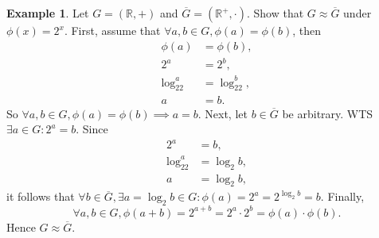 \documentclass{article}
\theoremstyle{definition}
\newtheorem{example}{Example}[section]
\begin{document}
 \begin{example}
    Let $G = (\mathbb{R},+)$ and $\overline{G} = (\mathbb{R}^+,\cdot)$. Show that $G \approx \overline{G}$ under $\phi(x)=2^x$.
    First, assume that $\forall a,b \in G, \phi(a) = \phi(b)$, then
    \begin{align*}
        \phi(a) &= \phi(b), \\
        2^a &= 2^b, \\
        \log_22^a &= \log_22^b, \\
        a &= b.
    \end{align*}
    So $\forall a,b \in G, \phi(a) = \phi(b) \implies a=b$. Next, let $b \in \overline{G}$ be arbitrary. WTS $\exists a \in G: 2^a = b$. Since
    \begin{align*}
        2^a &= b, \\
        \log_22^a &= \log_2b, \\
        a &= \log_2b,
    \end{align*}
    it follows that $\forall b \in \overline{G}, \exists a = \log_2b \in G: \phi(a) = 2^a = 2^{\log_2b} = b$. Finally, 
    \begin{equation*}
        \forall a,b \in G, \phi(a+b) = 2^{a+b} = 2^a \cdot 2^b = \phi(a) \cdot \phi(b).
    \end{equation*}
    Hence $G \approx \overline{G}$.
 \end{example}
 
\end{document}
